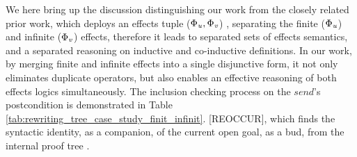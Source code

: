 \documentclass[acmsmall,10pt,review]{acmart}
\newcommand{\effect}{\textcolor{black}{\ensuremath{\mathrm{\Phi}}}}
\newcommand{\code}[1]{{\tt{\ensuremath{\m{#1}}}}}
\newcommand{\m}{\mathit}
\newcommand\tabref[1]{Table \textcolor{black}{\ref{#1}}.}
\begin{document}
We here bring up the discussion distinguishing our work from the closely related prior work,  which deploys an effects tuple (\code{\effect_{u},\effect_{v}}) \cite{nanjo2018fixpoint},  separating the finite (\code{\effect_{u}}) and infinite (\code{\effect_{v}}) effects, therefore it leads to separated sets of effects semantics, and a separated reasoning on inductive and co-inductive definitions. 
In our work, by merging finite and infinite effects into a single disjunctive form, it not only eliminates duplicate operators, but also enables an effective reasoning of both effects logics simultaneously.  
The inclusion checking process on the \code{send}'s postcondition is demonstrated in \tabref{tab:rewriting_tree_case_study_finit_infinit} [REOCCUR], which finds the syntactic identity, as a companion, of the current open goal, as a bud, from the internal proof tree \cite{brotherston2005cyclic}. 
\end{document}
